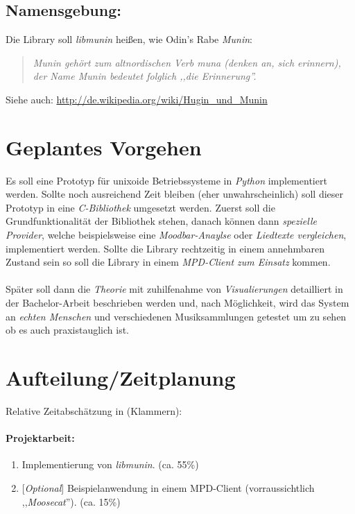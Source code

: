 \documentclass[8pt,a4paper,ngerman]{scrartcl}
\begin{document}
    \subsection{Namensgebung:}

        Die Library soll \emph{libmunin} heißen, wie Odin's Rabe \emph{Munin}:

        \begin{quote}
            \textit{Munin gehört zum altnordischen Verb muna (denken an, sich erinnern), 
            der Name Munin bedeutet folglich ,,die Erinnerung''.}
        \end{quote}

        Siehe auch: \url{http://de.wikipedia.org/wiki/Hugin_und_Munin}

\section{Geplantes Vorgehen}
    Es soll eine Prototyp für unixoide Betriebssysteme in \emph{Python} implementiert werden. Sollte noch
    ausreichend Zeit bleiben (eher unwahrscheinlich) soll dieser Prototyp in eine
    \emph{C-Bibliothek} umgesetzt werden. Zuerst soll die Grundfunktionalität der
    Bibliothek stehen, danach können dann \emph{spezielle Provider}, welche
    beispielsweise eine \emph{Moodbar-Anaylse} oder \emph{Liedtexte vergleichen}, implementiert
    werden. Sollte die Library rechtzeitig in einem annehmbaren Zustand sein so soll
    die Library in einem \emph{MPD-Client zum Einsatz} kommen. 
    \\
    \\
    Später soll dann die \emph{Theorie} mit zuhilfenahme von \emph{Visualierungen} detailliert in 
    der Bachelor-Arbeit beschrieben werden und, nach Möglichkeit, wird das System an 
    \emph{echten Menschen} und verschiedenen Musiksammlungen getestet um zu
    sehen ob es auch praxistauglich ist.

\section{Aufteilung/Zeitplanung}
    Relative Zeitabschätzung in (Klammern):

    \paragraph{Projektarbeit:}
        \begin{enumerate} 
            \item Implementierung von \emph{libmunin}. (ca. 55\%)
            \item {[}\emph{Optional}{]} Beispielanwendung in einem MPD-Client (vorraussichtlich
                ,,\emph{Moosecat}''). (ca. 15\%)
        \end{enumerate}
\end{document}
